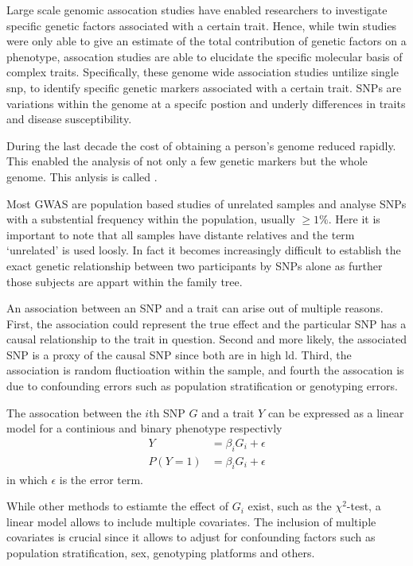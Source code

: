 Large scale genomic assocation studies have enabled researchers to investigate specific genetic factors associated with a certain trait.
Hence, while twin studies were only able to give an estimate of the total contribution of genetic factors on a phenotype, assocation studies are able to elucidate the specific molecular basis of complex traits.
Specifically, these genome wide association studies untilize single \acrfull{snp}, to identify specific genetic markers associated with a certain trait.
SNPs are variations within the genome at a specifc postion and underly differences in traits and disease susceptibility. 

During the last decade the cost of obtaining a person's genome reduced rapidly.
This enabled the analysis of not only a few genetic markers but the whole genome.
This anlysis is called .

Most GWAS are population based studies of unrelated samples and analyse SNPs with a substential frequency within the population, usually $\ge 1\%$.
Here it is important to note that all samples have distante relatives and the term `unrelated' is used loosly.
In fact it becomes increasingly difficult to establish the exact genetic relationship between two participants by SNPs alone as further those subjects are appart within the family tree.

An association between an SNP and a trait can arise out of multiple reasons.
First, the association could represent the true effect and the particular SNP has a causal relationship to the trait in question.
Second and more likely, the associated SNP is a proxy of the causal SNP since both are in high \acrfull{ld}.
Third, the association is random fluctioation within the sample, and fourth the assocation is due to confounding errors such as population stratification or genotyping errors.

The assocation between the $i$th SNP $G$ and a trait $Y$ can be expressed as a linear model for a continious and binary phenotype respectivly
\begin{align}
  Y &= \beta_{i}G_{i}+\epsilon \label{eq:gwas_identity}\\
  P(Y=1) &= \beta_{i}G_{i}+\epsilon \label{eq:gwas_logistic}
\end{align}
in which $\epsilon$ is the error term.

While other methods to estiamte the effect of $G_i$ exist, such as the $\chi^2$-test, a linear model allows to include multiple covariates.
The inclusion of multiple covariates is crucial since it allows to adjust for confounding factors such as population stratification, sex, genotyping platforms and others.


